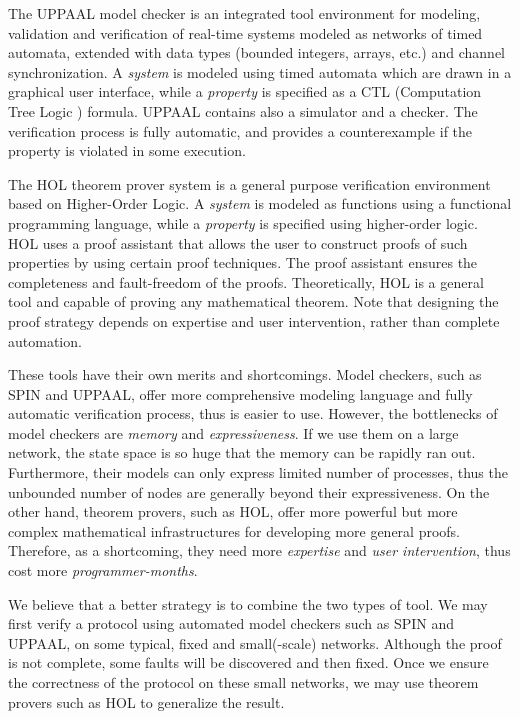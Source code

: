 \documentclass[a4paper,10pt,twocolumn]{article}
\begin{document}
The UPPAAL model checker \cite{HDL04} is an integrated tool environment for modeling, validation and verification of real-time systems modeled as networks of timed automata, extended with data types (bounded integers, arrays, etc.) and channel synchronization. A \emph{system} is modeled using timed automata which are drawn in a graphical user interface, while a \emph{property} is specified as a CTL (Computation Tree Logic \cite{HR04}) formula. UPPAAL contains also a simulator and a checker. The verification process is fully automatic, and provides a counterexample if the property is violated in some execution.

The HOL theorem prover system \cite{GM93} is a general purpose verification environment based on Higher-Order Logic. A \emph{system} is modeled as functions using a functional programming language, while a \emph{property} is specified using higher-order logic. HOL uses a proof assistant that allows the user to construct proofs of such properties by using certain proof techniques. The proof assistant ensures the completeness and fault-freedom of the proofs. Theoretically, HOL is a general tool and capable of proving any mathematical theorem. Note that designing the proof strategy depends on expertise and user intervention, rather than complete automation.

These tools have their own merits and shortcomings. Model checkers, such as SPIN and UPPAAL, offer more comprehensive modeling language and fully automatic verification process, thus is easier to use. However, the bottlenecks of model checkers are \emph{memory} and \emph{expressiveness}. If we use them on a large network, the state space is so huge that the memory can be rapidly ran out. Furthermore, their models can only express limited number of processes, thus the unbounded number of nodes are generally beyond their expressiveness. On the other hand, theorem provers, such as HOL, offer more powerful but more complex mathematical infrastructures for developing more general proofs. Therefore, as a shortcoming, they need more \emph{expertise} and \emph{user intervention}, thus cost more \emph{programmer-months}.

We believe that a better strategy is to combine the two types of tool. We may first verify a protocol using automated model checkers such as SPIN and UPPAAL, on some typical, fixed and small(-scale) networks. Although the proof is not complete, some faults will be discovered and then fixed. Once we ensure the correctness of the protocol on these small networks, we may use theorem provers such as HOL to generalize the result.
\end{document}
